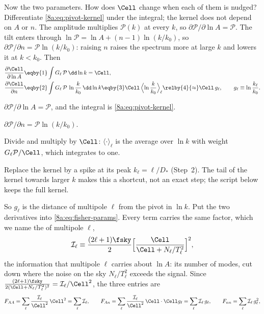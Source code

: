 Now the two parameters. How does $\Cell$ change when each of them is nudged? Differentiate
\eqref{8a:eq:pivot-kernel} under the integral; the kernel does not depend on $A$ or $n$.
The amplitude multiplies $\mathcal P(k)$ at every $k$, so $\partial\mathcal P/\partial\ln A=\mathcal P$.
The tilt enters through $\ln\mathcal P=\ln A+(n-1)\ln(k/k_0)$, so $\partial\mathcal P/\partial n=\mathcal P\ln(k/k_0)$:
raising $n$ raises the spectrum more at large $k$ and lowers it at $k<k_0$. Then
\begin{align}
  \frac{\partial\Cell}{\partial\ln A}
  &\eqby{1}\int G_\ell\,\mathcal P\,\dd\ln k=\Cell ,
  \nonumber\\
  \frac{\partial\Cell}{\partial n}
  &\eqby{2}\int G_\ell\,\mathcal P\,\ln\frac{k}{k_0}\,\dd\ln k
   \eqby{3}\Cell\,\Bigl\langle\ln\frac{k}{k_0}\Bigr\rangle_\ell
   \relby{4}{\approx}\Cell\,g_\ell ,\qquad g_\ell\equiv\ln\frac{k_\ell}{k_0}.
  \nonumber
\end{align}
\begin{explain}
  \item $\partial\mathcal P/\partial\ln A=\mathcal P$, and the integral is \eqref{8a:eq:pivot-kernel}.
  \item $\partial\mathcal P/\partial n=\mathcal P\ln(k/k_0)$.
  \item Divide and multiply by $\Cell$: $\langle\cdot\rangle_\ell$ is the average over $\ln k$ with
        weight $G_\ell\mathcal P/\Cell$, which integrates to one.
  \item Replace the kernel by a spike at its peak $k_\ell=\ell/D_*$ (Step~2). The tail of the kernel
        towards larger $k$ makes this a shortcut, not an exact step; the script below keeps the
        full kernel.
\end{explain}
So $g_\ell$ is the distance of multipole $\ell$ from the pivot in $\ln k$. Put the two derivatives
into \eqref{8a:eq:fisher-params}. Every term carries the same factor, which we name the
 of multipole $\ell$,
\[
  \mathcal I_\ell\equiv\frac{(2\ell+1)\fsky}{2}\Bigl[\frac{\Cell}{\Cell+N_\ell/T_\ell^2}\Bigr]^2 ,
\]
the information that multipole $\ell$ carries about $\ln A$: its number of modes, cut down where
the noise on the sky $N_\ell/T_\ell^2$ exceeds the signal. Since
$\frac{(2\ell+1)\fsky}{2(\Cell+N_\ell/T_\ell^2)^2}=\mathcal I_\ell/\Cell^2$, the three entries are
\[
  F_{AA}=\sum_\ell\frac{\mathcal I_\ell}{\Cell^2}\,\Cell^2=\sum_\ell\mathcal I_\ell,\qquad
  F_{An}=\sum_\ell\frac{\mathcal I_\ell}{\Cell^2}\,\Cell\cdot\Cell g_\ell=\sum_\ell\mathcal I_\ell\,g_\ell,\qquad
  F_{nn}=\sum_\ell\mathcal I_\ell\,g_\ell^2,
\]
